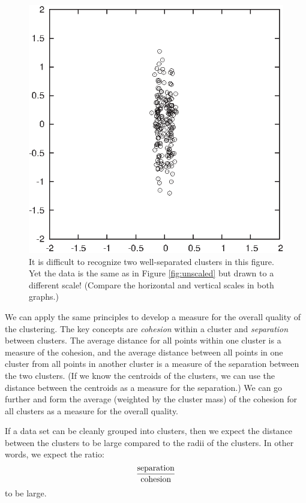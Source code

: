 
\begin{figure}
  \centerline{\includegraphics{img/scaled}}
  \caption{It is difficult to recognize two well-separated clusters in this figure. Yet the data is
    the same as in Figure \ref{fig:unscaled} but drawn to a different
    scale! (Compare the horizontal and vertical scales in both
    graphs.)}
  \label{fig:scaled}
\end{figure}     

We can apply the same principles to develop a measure for the overall
quality of the clustering. The key concepts are \emph{cohesion}  within
a cluster and \emph{separation}  between clusters. The average distance
for all points within one cluster is a measure of the cohesion, and the
average distance between all points in one cluster from all points in
another cluster is a measure of the separation between the two clusters.
(If we know the centroids of the clusters, we can use the distance
between the centroids as a measure for the separation.)  We can go
further and form the average (weighted by the cluster mass) of the
cohesion for all clusters as a measure for the overall quality.

If a data set can be cleanly grouped into clusters, then we expect the
distance between the clusters to be large compared to the radii of the
clusters.  In other words, we expect the ratio:\vspace*{-3pt}
%
\[
\frac{\text{separation}}{\text{cohesion}}\vspace*{-3pt}
\]
%
to be large.


